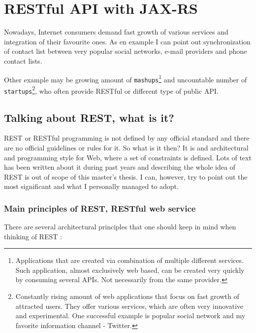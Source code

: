 \chapter{RESTful API with JAX-RS}\label{cha:rest}

	Nowadays, Internet consumers demand fast growth of various services and integration of their favourite ones. As en
	example I can point out synchronization of contact list between very popular social networks, e-mail providers and
	phone contact lists. 
	
	Other example may be growing amount of \verb|mashups|\footnote{Applications that are created via
	combination of multiple different services. Such application, almost exclusively web based, can be created very quickly
	by consuming several \gls{API}s. Not necessarily from the same provider.} and uncountable number of
	\verb|startups|\footnote{Constantly rising amount of web applications that focus on fast growth of attracted users.
	They offer various services, which are often very innovative and experimental. One successful example is popular
	social network and my favorite information channel - Twitter.}, who often provide RESTful or different type of public
	\gls{API}.

	\section{Talking about REST, what is it?}
	
	\gls{REST} or RESTful programming is not defined by any official standard and there are no official guidelines or rules
	for it.
	So what is it then? It is and architectural and programming style for Web, where a set of constraints is defined. Lots
	of text has been written about it during past years and describing the whole idea of REST is out of scope of this
	master's thesis. I can, however, try to point out the most significant and what I personally managed to adopt.
	
	\subsection{Main principles of REST, RESTful web service}
	
	There are several architectural principles that one should keep in mind when thinking of REST \cite[p.~3]{restful}:
	

